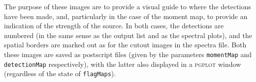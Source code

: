The purpose of these images are to provide a visual guide to where the
detections have been made, and, particularly in the case of the moment
map, to provide an indication of the strength of the source. In both
cases, the detections are numbered (in the same sense as the output
list and as the spectral plots), and the spatial borders are marked
out as for the cutout images in the spectra file. Both these images
are saved as postscript files (given by the parameters
\texttt{momentMap} and \texttt{detectionMap} respectively), with the
latter also displayed in a \textsc{pgplot} window (regardless of the
state of \texttt{flagMaps}).
